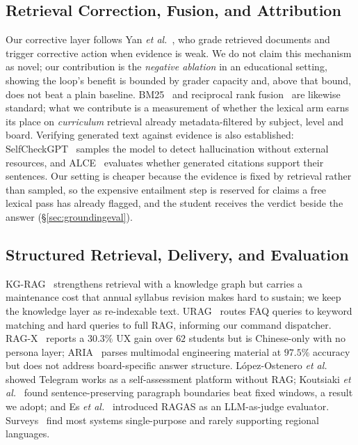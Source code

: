 \documentclass[conference]{IEEEtran}
\begin{document}
\subsection{Retrieval Correction, Fusion, and Attribution}
Our corrective layer follows Yan \textit{et al.}~\cite{yan2024crag}, who grade
retrieved documents and trigger corrective action when evidence is weak. We do
not claim this mechanism as novel; our contribution is the \emph{negative
ablation} in an educational setting, showing the loop's benefit is bounded by
grader capacity and, above that bound, does not beat a plain baseline.
BM25~\cite{robertson2009} and reciprocal rank fusion~\cite{cormack2009} are
likewise standard; what we contribute is a measurement of whether the lexical
arm earns its place on \emph{curriculum} retrieval already metadata-filtered by
subject, level and board. Verifying generated text against evidence is also
established: SelfCheckGPT~\cite{manakul2023} samples the model to detect
hallucination without external resources, and ALCE~\cite{gao2023} evaluates
whether generated citations support their sentences. Our setting is cheaper
because the evidence is fixed by retrieval rather than sampled, so the expensive
entailment step is reserved for claims a free lexical pass has already flagged,
and the student receives the verdict beside the answer
(§\ref{sec:groundingeval}).

\subsection{Structured Retrieval, Delivery, and Evaluation}
KG-RAG~\cite{dong2025} strengthens retrieval with a knowledge graph but carries
a maintenance cost that annual syllabus revision makes hard to sustain; we keep
the knowledge layer as re-indexable text. URAG~\cite{nguyen2025} routes FAQ
queries to keyword matching and hard queries to full RAG, informing our command
dispatcher. RAG-X~\cite{he2025} reports a $30.3\%$ UX gain over $62$ students
but is Chinese-only with no persona layer; ARIA~\cite{luo2026} parses
multimodal engineering material at $97.5\%$ accuracy but does not address
board-specific answer structure. L\'opez-Ostenero \textit{et
al.}~\cite{gielis2025} showed Telegram works as a self-assessment platform
without RAG; Koutsiaki \textit{et al.}~\cite{koutsiaki2025} found
sentence-preserving paragraph boundaries beat fixed windows, a result we adopt;
and Es \textit{et al.}~\cite{es2025} introduced RAGAS as an LLM-as-judge
evaluator. Surveys~\cite{kuhail2023,wollny2021} find most systems
single-purpose and rarely supporting regional languages.
\end{document}
